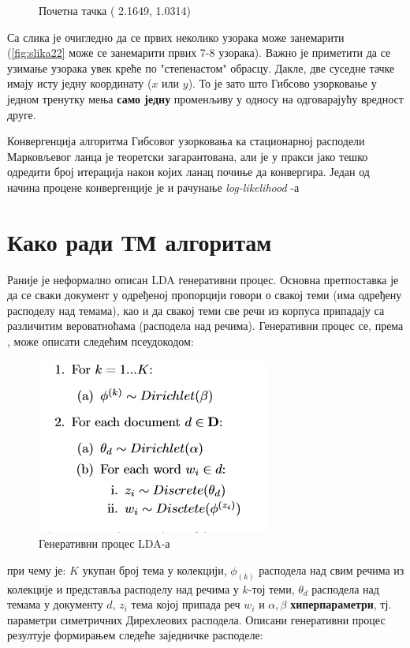 \begin{figure}[H]
  \caption{Почетна тачка ( 2.1649, 1.0314)}\label{fig:slika24}
\endminipage
\end{figure}

Са слика је очигледно да се првих неколико узорака може занемарити (\ref{fig:slika22} може се занемарити првих 7-8 узорака). Важно је приметити да се узимање узорака увек креће по "степенастом" обрасцу. Дакле, две суседне тачке имају исту једну координату ($x$ или $y$). То је зато што Гибсово узорковање у једном тренутку мења \textbf{само једну} променљиву у односу на одговарајућу вредност друге.

Конвергенција алгоритма Гибсовог узорковања ка стационарној расподели Марковљевог ланца је теоретски загарантована, али је у пракси јако тешко одредити број итерација након којих ланац почиње да конвергира. Један од начина процене конвергенције је и рачунање \textit{log-likelihood} -а

\section{Како ради ТМ алгоритам}

Раније је неформално описан  LDA генеративни процес. Основна претпоставка је да се сваки документ у одређеној пропорцији говори о свакој теми (има одређену расподелу над темама), као и да свакој теми све речи из корпуса припадају са различитим вероватноћама (расподела над речима).  Генеративни процес се, према \cite{verov9}, може описати следећим псеудокодом:

\begin{figure}[H]
  \includegraphics[scale=0.8]{./Slike/slika27.png} 
  \caption{Генеративни процес LDA-а }\label{fig:slika27}
\end{figure}

при чему је:
$K$ укупан број тема у колекцији,
$\phi_{(k)}$ расподела над свим речима из колекције и представља расподелу над речима у $k$-тој теми,
$\theta_d$ расподела над темама у документу $d$, 
$z_i$ тема којој припада реч $w_i$ и 
$\alpha,\beta$ \textbf{хиперпараметри}, тј. параметри симетричних Дирехлеових расподела. Описани генеративни процес резултује формирањем следеће заједничке расподеле:

